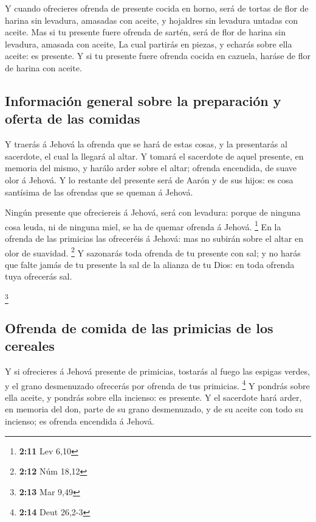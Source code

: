 Y cuando ofrecieres ofrenda de presente cocida en horno,
será de tortas de flor de harina sin levadura, amasadas con aceite, y
hojaldres sin levadura untadas con aceite.  Mas si tu
presente fuere ofrenda de sartén, será de flor de harina sin levadura,
amasada con aceite,  La cual partirás en piezas, y echarás
sobre ella aceite: es presente.  Y si tu presente fuere
ofrenda cocida en cazuela, haráse de flor de harina con aceite.

\hypertarget{informaciuxf3n-general-sobre-la-preparaciuxf3n-y-oferta-de-las-comidas}{%
\subsection{Información general sobre la preparación y oferta de las
comidas}\label{informaciuxf3n-general-sobre-la-preparaciuxf3n-y-oferta-de-las-comidas}}

 Y traerás á Jehová la ofrenda que se hará de estas cosas,
y la presentarás al sacerdote, el cual la llegará al altar.
 Y tomará el sacerdote de aquel presente, en memoria del
mismo, y harálo arder sobre el altar; ofrenda encendida, de suave olor á
Jehová.  Y lo restante del presente será de Aarón y de
sus hijos: es cosa santísima de las ofrendas que se queman á Jehová.

 Ningún presente que ofreciereis á Jehová, será con
levadura: porque de ninguna cosa leuda, ni de ninguna miel, se ha de
quemar ofrenda á Jehová. \footnote{\textbf{2:11} Lev 6,10}
 En la ofrenda de las primicias las ofreceréis á Jehová:
mas no subirán sobre el altar en olor de suavidad. \footnote{\textbf{2:12}
  Núm 18,12}  Y sazonarás toda ofrenda de tu presente con
sal; y no harás que falte jamás de tu presente la sal de la alianza de
tu Dios: en toda ofrenda tuya ofrecerás sal.

\footnote{\textbf{2:13} Mar 9,49}

\hypertarget{ofrenda-de-comida-de-las-primicias-de-los-cereales}{%
\subsection{Ofrenda de comida de las primicias de los
cereales}\label{ofrenda-de-comida-de-las-primicias-de-los-cereales}}

 Y si ofrecieres á Jehová presente de primicias, tostarás
al fuego las espigas verdes, y el grano desmenuzado ofrecerás por
ofrenda de tus primicias. \footnote{\textbf{2:14} Deut 26,2-3}
 Y pondrás sobre ella aceite, y pondrás sobre ella
incienso: es presente.  Y el sacerdote hará arder, en
memoria del don, parte de su grano desmenuzado, y de su aceite con todo
su incienso; es ofrenda encendida á Jehová.

